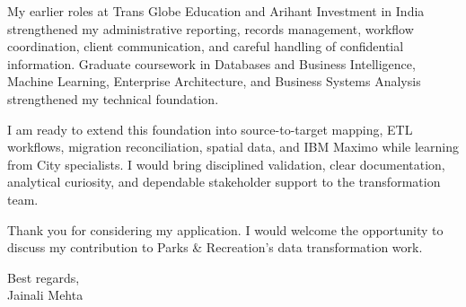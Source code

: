 \documentclass[letterpaper,10pt]{article}
\begin{document}
My earlier roles at Trans Globe Education and Arihant Investment in India strengthened my administrative reporting, records management, workflow coordination, client communication, and careful handling of confidential information. Graduate coursework in Databases and Business Intelligence, Machine Learning, Enterprise Architecture, and Business Systems Analysis strengthened my technical foundation.

I am ready to extend this foundation into source-to-target mapping, ETL workflows, migration reconciliation, spatial data, and IBM Maximo while learning from City specialists. I would bring disciplined validation, clear documentation, analytical curiosity, and dependable stakeholder support to the transformation team.

Thank you for considering my application. I would welcome the opportunity to discuss my contribution to Parks \& Recreation's data transformation work.

Best regards,\\[8pt]
Jainali Mehta
\end{document}

